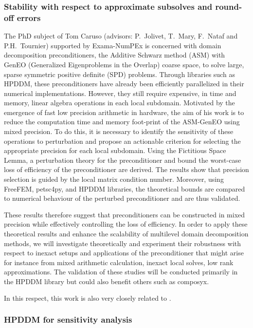  \subsubsection{Stability with respect to approximate subsolves and round-off errors}
\label{sec:wp3:T31:ddmroundoff}
The PhD subject of Tom Caruso (advisors: P.~Jolivet, T.~Mary, F.~Nataf and P.H.~Tournier) supported by Exama-NumPEx is concerned with domain decomposition preconditioners, the Additive Schwarz method (ASM) with GenEO (Generalized Eigenproblems in the Overlap) coarse space, to solve large, sparse symmetric positive definite (SPD) problems. 
Through libraries such as HPDDM, these preconditioners have already been efficiently parallelized in their numerical implementations. 
However, they still require expensive, in time and memory, linear algebra operations in each local subdomain. 
Motivated by the emergence of fast low precision arithmetic in hardware, the aim of his work is to reduce the computation time and memory foot-print of the ASM-GenEO using mixed precision. 
To do this, it is necessary to identify the sensitivity of these operations to perturbation and propose an actionable criterion for selecting the appropriate precision for each local subdomain.
Using the Fictitious Space Lemma, a perturbation theory for the preconditioner and bound the worst-case loss of efficiency of the preconditioner are derived. The results show that  precision selection is guided by the local matrix condition number. 
Moreover, using FreeFEM, petsc4py, and HPDDM libraries, the theoretical bounds are compared to numerical behaviour of the perturbed preconditioner and are thus validated. 

These results therefore suggest that preconditioners can be constructed in mixed precision while effectively controlling the loss of efficiency. In order to apply these theoretical results and enhance the scalability of
multilevel domain decomposition methods, we will investigate theoretically and experiment their
robustness with respect to inexact setups and applications of the preconditioner that might arise for
instance from mixed arithmetic calculation, inexact local solves, low rank approximations. The
validation of these studies will be conducted primarily in the HPDDM library but could also benefit
others such as composyx. 


In this respect, this work is also very closely related to . 


 \subsubsection{HPDDM for sensitivity analysis}
 
